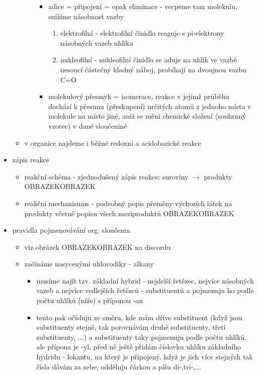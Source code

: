 \documentclass{article}
\begin{document}
\begin{itemize}
\begin{itemize}
\begin{itemize}
\begin{itemize}
        \item adice = připojení = opak eliminace - vecpeme tam molekulu, snížíme násobnost vazby
        \begin{enumerate}
          \item elektrofilní - elektrofilní činidlo reaguje s pi-elektrony násobných vazeb uhlíku
          \item nukleofilní - nukleofilní činidlo se aduje na uhlík ve vazbě nesoucí částečný kladný náboj, probíhají na dvoujnou vazbu C=O
        \end{enumerate}
        \item molekulový přesmyk = isomerace, reakce v jejímž průběhu dochází k přesunu (přeskupení) určitých atomů z jednoho místa v molekule na místo jiné, aniž se měni chemické složení (souhrnný vzorec) v dané sloučenině
      \end{itemize}
    \end{itemize}
    \item v organice najdeme i běžné redoxní a acidobazické reakce
  \end{itemize}
  \item zápis reakce
  \begin{itemize}
    \item reakční schéma - zjednodušený zápis reakce: suroviny $\rightarrow$ produkty OBRAZEKOBRAZEK
    \item reakční mechanismus - podrobný popis přeměny výchozích látek na produkty včetně popisu všech meziproduktů OBRAZEKOBRAZEK
  \end{itemize}
  \item pravidla pojmenovávání org. sloučenin
  \begin{itemize}
    \item viz obrázek OBRAZEKOBRAZEK na discordu
    \item začínáme nasycenými uhlovodíky - alkany
    \begin{itemize}
      \item musíme najít tzv. základní hybrid - nejdelší řetězec, nejvíce násobných vazeb a nejvíce vedlejších řetězců - substituentů a pojmenuju ho podle počtu uhlíků (níže) s příponou -an
      \item tento pak očísluju ze směru, kde mám dříve substituent (když jsou substituenty stejně, tak porovnávám druhé substituenty, třetí substituenty, ...) a substituenty taky pojmenuju podle počtu uhlíků, ale přípona je -yl, před ně ještě přidám číslovku uhlíku základního hydridu - lokantu, na který je připojený, když je jich více stejných tak čísla dávám za sebe, odděluju čárkou a píšu di-,tri-,...

\end{itemize}
\end{itemize}
\end{itemize}
\end{document}
